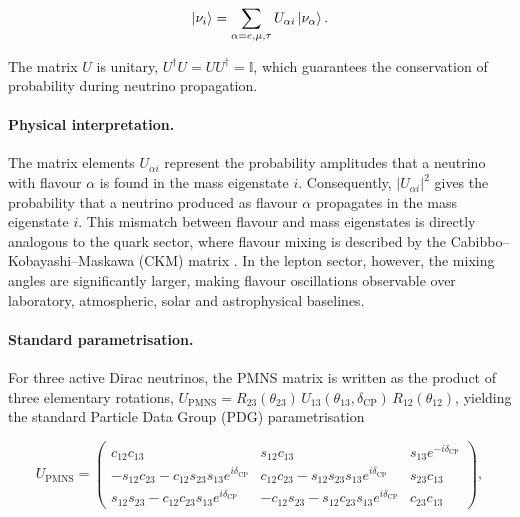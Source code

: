 \begin{equation}
  \left|\nu_i\right\rangle = \sum_{\alpha=e,\mu,\tau} U_{\alpha i}\left|\nu_\alpha\right\rangle.
\end{equation}

The matrix \(U\) is unitary, \(U^{\dagger}U=UU^{\dagger}=\mathbb{I}\), which guarantees the conservation of probability during neutrino propagation.

\paragraph{Physical interpretation.}
The matrix elements \(U_{\alpha i}\) represent the probability amplitudes that a neutrino with flavour \(\alpha\) is found in the mass eigenstate \(i\). Consequently, \(|U_{\alpha i}|^2\) gives the probability that a neutrino produced as flavour \(\alpha\) propagates in the mass eigenstate \(i\). This mismatch between flavour and mass eigenstates is directly analogous to the quark sector, where flavour mixing is described by the Cabibbo--Kobayashi--Maskawa (CKM) matrix \parencite{PDG2022}. In the lepton sector, however, the mixing angles are significantly larger, making flavour oscillations observable over laboratory, atmospheric, solar and astrophysical baselines.

\paragraph{Standard parametrisation.}
For three active Dirac neutrinos, the PMNS matrix is written as the product of three elementary rotations, \(U_{\mathrm{PMNS}}=R_{23}(\theta_{23})\,U_{13}(\theta_{13},\delta_{\mathrm{CP}})\,R_{12}(\theta_{12})\), yielding the standard Particle Data Group (PDG) parametrisation \parencite{PDG2022}

\begin{equation}
  U_{\mathrm{PMNS}} =
  \begin{pmatrix}
    c_{12}c_{13} & s_{12}c_{13} & s_{13}e^{-i\delta_{\mathrm{CP}}}\\
    -s_{12}c_{23}-c_{12}s_{23}s_{13}e^{i\delta_{\mathrm{CP}}} & c_{12}c_{23}-s_{12}s_{23}s_{13}e^{i\delta_{\mathrm{CP}}} & s_{23}c_{13}\\
    s_{12}s_{23}-c_{12}c_{23}s_{13}e^{i\delta_{\mathrm{CP}}} & -c_{12}s_{23}-s_{12}c_{23}s_{13}e^{i\delta_{\mathrm{CP}}} & c_{23}c_{13}
  \end{pmatrix},
\end{equation}

